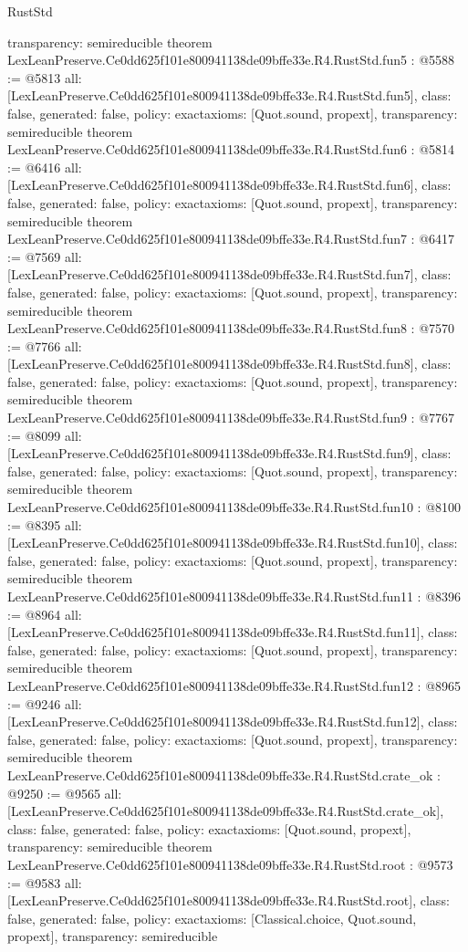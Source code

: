\begin{lexlean}{RustStd}
\begin{coremodule}
{  transparency: semireducible
}
theorem LexLeanPreserve.Ce0dd625f101e800941138de09bffe33e.R4.RustStd.fun5 : @5588 := @5813 {
  all: [LexLeanPreserve.Ce0dd625f101e800941138de09bffe33e.R4.RustStd.fun5],
  class: false,
  generated: false,
  policy: exact{axioms: [Quot.sound, propext]},
  transparency: semireducible
}
theorem LexLeanPreserve.Ce0dd625f101e800941138de09bffe33e.R4.RustStd.fun6 : @5814 := @6416 {
  all: [LexLeanPreserve.Ce0dd625f101e800941138de09bffe33e.R4.RustStd.fun6],
  class: false,
  generated: false,
  policy: exact{axioms: [Quot.sound, propext]},
  transparency: semireducible
}
theorem LexLeanPreserve.Ce0dd625f101e800941138de09bffe33e.R4.RustStd.fun7 : @6417 := @7569 {
  all: [LexLeanPreserve.Ce0dd625f101e800941138de09bffe33e.R4.RustStd.fun7],
  class: false,
  generated: false,
  policy: exact{axioms: [Quot.sound, propext]},
  transparency: semireducible
}
theorem LexLeanPreserve.Ce0dd625f101e800941138de09bffe33e.R4.RustStd.fun8 : @7570 := @7766 {
  all: [LexLeanPreserve.Ce0dd625f101e800941138de09bffe33e.R4.RustStd.fun8],
  class: false,
  generated: false,
  policy: exact{axioms: [Quot.sound, propext]},
  transparency: semireducible
}
theorem LexLeanPreserve.Ce0dd625f101e800941138de09bffe33e.R4.RustStd.fun9 : @7767 := @8099 {
  all: [LexLeanPreserve.Ce0dd625f101e800941138de09bffe33e.R4.RustStd.fun9],
  class: false,
  generated: false,
  policy: exact{axioms: [Quot.sound, propext]},
  transparency: semireducible
}
theorem LexLeanPreserve.Ce0dd625f101e800941138de09bffe33e.R4.RustStd.fun10 : @8100 := @8395 {
  all: [LexLeanPreserve.Ce0dd625f101e800941138de09bffe33e.R4.RustStd.fun10],
  class: false,
  generated: false,
  policy: exact{axioms: [Quot.sound, propext]},
  transparency: semireducible
}
theorem LexLeanPreserve.Ce0dd625f101e800941138de09bffe33e.R4.RustStd.fun11 : @8396 := @8964 {
  all: [LexLeanPreserve.Ce0dd625f101e800941138de09bffe33e.R4.RustStd.fun11],
  class: false,
  generated: false,
  policy: exact{axioms: [Quot.sound, propext]},
  transparency: semireducible
}
theorem LexLeanPreserve.Ce0dd625f101e800941138de09bffe33e.R4.RustStd.fun12 : @8965 := @9246 {
  all: [LexLeanPreserve.Ce0dd625f101e800941138de09bffe33e.R4.RustStd.fun12],
  class: false,
  generated: false,
  policy: exact{axioms: [Quot.sound, propext]},
  transparency: semireducible
}
theorem LexLeanPreserve.Ce0dd625f101e800941138de09bffe33e.R4.RustStd.crate_ok : @9250 := @9565 {
  all: [LexLeanPreserve.Ce0dd625f101e800941138de09bffe33e.R4.RustStd.crate_ok],
  class: false,
  generated: false,
  policy: exact{axioms: [Quot.sound, propext]},
  transparency: semireducible
}
theorem LexLeanPreserve.Ce0dd625f101e800941138de09bffe33e.R4.RustStd.root : @9573 := @9583 {
  all: [LexLeanPreserve.Ce0dd625f101e800941138de09bffe33e.R4.RustStd.root],
  class: false,
  generated: false,
  policy: exact{axioms: [Classical.choice, Quot.sound, propext]},
  transparency: semireducible
}


\end{coremodule}
\end{lexlean}
